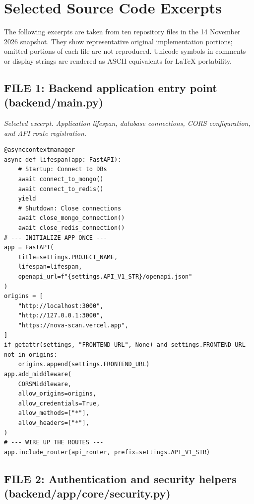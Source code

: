 \documentclass[11pt,a4paper]{article}
\begin{document}
{\vspace{1.5em}

\section{Selected Source Code Excerpts}

The following excerpts are taken from ten repository files in the 14 November 2026 snapshot. They show representative original implementation portions; omitted portions of each file are not reproduced. Unicode symbols in comments or display strings are rendered as ASCII equivalents for LaTeX portability.

\subsection{FILE 1: Backend application entry point\\(backend/main.py)}

\textit{Selected excerpt. Application lifespan, database connections, CORS configuration, and API route registration.}

\begin{lstlisting}[style=python]
@asynccontextmanager
async def lifespan(app: FastAPI):
    # Startup: Connect to DBs
    await connect_to_mongo()
    await connect_to_redis()
    yield
    # Shutdown: Close connections
    await close_mongo_connection()
    await close_redis_connection()
# --- INITIALIZE APP ONCE ---
app = FastAPI(
    title=settings.PROJECT_NAME,
    lifespan=lifespan,
    openapi_url=f"{settings.API_V1_STR}/openapi.json"
)
origins = [
    "http://localhost:3000",
    "http://127.0.0.1:3000",
    "https://nova-scan.vercel.app",
]
if getattr(settings, "FRONTEND_URL", None) and settings.FRONTEND_URL not in origins:
    origins.append(settings.FRONTEND_URL)
app.add_middleware(
    CORSMiddleware,
    allow_origins=origins,
    allow_credentials=True,
    allow_methods=["*"],
    allow_headers=["*"],
)
# --- WIRE UP THE ROUTES ---
app.include_router(api_router, prefix=settings.API_V1_STR)
\end{lstlisting}

\subsection{FILE 2: Authentication and security helpers\\(backend/app/core/security.py)}

}
\end{document}
